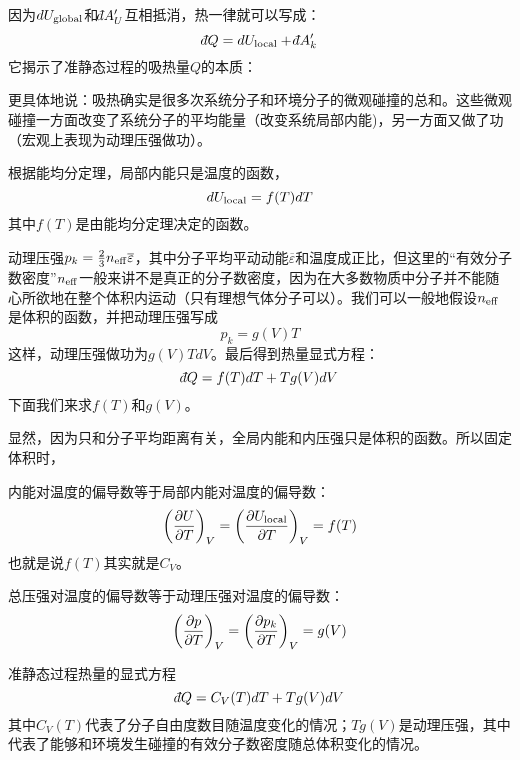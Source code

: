 \documentclass[CJK]{beamer}
\begin{document}
\begin{frame}
\bch
因为$d U_{\rm global}$和$\dbar A'_U$互相抵消，热一律就可以写成：
$$ \dbar Q = d U_{\rm local}  +\dbar A'_k  $$
它揭示了准静态过程的吸热量$Q$的本质：


更具体地说：吸热确实是很多次系统分子和环境分子的微观碰撞的总和。这些微观碰撞一方面改变了系统分子的平均能量（改变系统局部内能)，另一方面又做了功（宏观上表现为动理压强做功）。


\ech
\end{frame}

\begin{frame}
\bch
根据能均分定理，{\blue 局部内能只是温度的函数}，
$$d U_{\rm local} = f(T) dT$$
其中$f(T)$是由能均分定理决定的函数。

\skipline

动理压强$p_k = \frac{2}{3}n_{\rm eff}\overline{\varepsilon}$，其中分子平均平动动能$\overline{\varepsilon}$和温度成正比，但这里的“有效分子数密度”$n_{\rm eff}$一般来讲不是真正的分子数密度，因为在大多数物质中分子并不能随心所欲地在整个体积内运动（只有理想气体分子可以）。我们可以一般地假设$n_{\rm eff}$是体积的函数，并把动理压强写成
{\blue
$$ p_k = g(V) T$$}
这样，动理压强做功为$g(V)T dV$。最后得到热量显式方程：$$\dbar Q = f(T)dT + Tg(V) dV$$
下面我们来求$f(T)$和$g(V)$。

\ech
\end{frame}



\begin{frame}
\bch
显然，因为只和分子平均距离有关，{\blue 全局内能和内压强只是体积的函数}。所以固定体积时，

\bitem
\item{内能对温度的偏导数等于局部内能对温度的偏导数：
$$ \left(\frac{\partial U}{\partial T}\right)_{V} = \left(\frac{\partial U_{\rm local}}{\partial T}\right)_{V} = f(T) $$
也就是说$f(T)$其实就是$C_V$。}
\item{
总压强对温度的偏导数等于动理压强对温度的偏导数：
$$\left(\frac{\partial p}{\partial T}\right)_{V} = \left(\frac{\partial p_k}{\partial T}\right)_{V} = g(V)$$}
\eitem
\ech
\end{frame}

\begin{frame}
\bch
准静态过程热量的显式方程
\tbox
{$$\dbar Q = C_V(T)dT + T g(V) dV$$}
其中$C_V(T)$代表了分子自由度数目随温度变化的情况；$Tg(V)$是动理压强，其中
代表了能够和环境发生碰撞的有效分子数密度随总体积变化的情况。

\ech
\end{frame}
\end{document}
